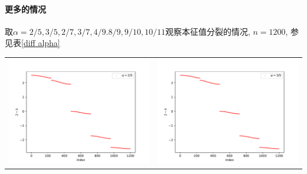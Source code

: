 \documentclass[a4paper,zihao=5,UTF8]{ctexart}
\begin{document}
	\paragraph{更多的情况}
	取$\alpha = 2/5, 3/5, 2/7, 3/7, 4/9. 8/9, 9/10, 10/11$观察本征值分裂的情况, $n=1200$, 参见表\ref{diff alpha}
	\begin{table}[htbp]
		\centering
		\begin{tabular}[htbp]{cc}
			\includegraphics[scale=0.5]{5_alpha_2_5.pdf} & \includegraphics[scale=0.5]{5_alpha_3_5.pdf}\\

\end{tabular}
\end{table}
\end{document}
